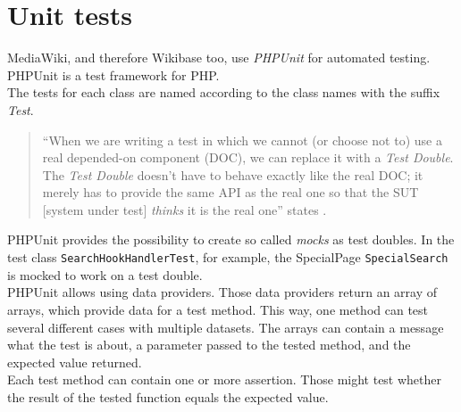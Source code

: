 \section{Unit tests}

MediaWiki, and therefore Wikibase too, use \textit{PHPUnit} for automated testing. PHPUnit is a test framework for PHP. \\
The tests for each class are named according to the class names with the suffix \textit{Test}. \\
\begin{quote}
 ``When we are writing a test in which we cannot (or choose not to) use a real depended-on component (DOC), we can replace it with a \textit{Test Double}. The \textit{Test Double} doesn't have to behave exactly like the real DOC; it merely has to provide the same API as the real one so that the SUT [system under test] \textit{thinks} it is the real one'' states \citet{testing}. 
\end{quote}
PHPUnit provides the possibility to create so called \textit{mocks} as test doubles. In the test class \texttt{SearchHookHandlerTest}, for example, the SpecialPage \texttt{SpecialSearch} is mocked to work on a test double. \\
PHPUnit allows using data providers. Those data providers return an array of arrays, which provide data for a test method. This way, one method can test several different cases with multiple datasets. The arrays can contain a message what the test is about, a parameter passed to the tested method, and the expected value returned. \\
Each test method can contain one or more assertion. Those might test whether the result of the tested function equals the expected value. 

